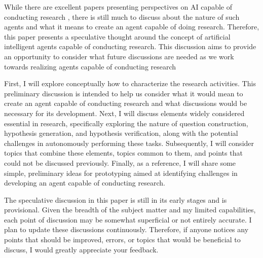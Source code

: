 While there are excellent papers presenting perspectives on AI capable of conducting research \cite{zenil2023future,coley2020autonomous,coley2020autonomousII,kitano2021nobel,wang2023scientific,zenil2023,zhang2023artificial,hope2022computational}, there is still much to discuss about the nature of such agents and what it means to create an agent capable of doing research. Therefore, this paper presents a speculative thought around the concept of artificial intelligent agents capable of conducting research. This discussion aims to provide an opportunity to consider what future discussions are needed as we work towards realizing agents capable of conducting research 

First, I will explore conceptually how to characterize the research activities. This preliminary discussion is intended to help us consider what it would mean to create an agent capable of conducting research and what discussions would be necessary for its development. Next, I will discuss elements widely considered essential in research, specifically exploring the nature of question construction, hypothesis generation, and hypothesis verification, along with the potential challenges in autonomously performing these tasks.  Subsequently, I will consider topics that combine these elements, topics common to them, and points that could not be discussed previously. Finally, as a reference, I will share some simple, preliminary ideas for prototyping aimed at identifying challenges in developing an agent capable of conducting research.

The speculative discussion in this paper is still in its early stages and is provisional. Given the breadth of the subject matter and my limited capabilities, each point of discussion may be somewhat superficial or not entirely accurate. I plan to update these discussions continuously. Therefore, if anyone notices any points that should be improved, errors, or topics that would be beneficial to discuss, I would greatly appreciate your feedback.
